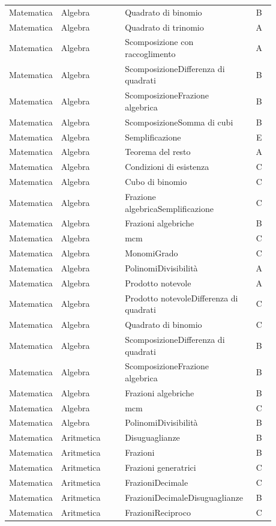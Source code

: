 \documentclass[20pt, a4paper]{article}
\begin{document}
\begin{longtable}{@{}>{\raggedright\arraybackslash}p{0.18\linewidth}>{\raggedright\arraybackslash}p{0.24\linewidth}>{\raggedright\arraybackslash}p{0.46\linewidth}c@{}}
Matematica & Algebra & Quadrato di binomio & B \\
Matematica & Algebra & Quadrato di trinomio & A \\
Matematica & Algebra & Scomposizione con raccoglimento & A \\
Matematica & Algebra & ScomposizioneDifferenza di quadrati & B \\
Matematica & Algebra & ScomposizioneFrazione algebrica & B \\
Matematica & Algebra & ScomposizioneSomma di cubi & B \\
Matematica & Algebra & Semplificazione & E \\
Matematica & Algebra & Teorema del resto & A \\
Matematica & Algebra & Condizioni di esistenza & C \\
Matematica & Algebra & Cubo di binomio & C \\
Matematica & Algebra & Frazione algebricaSemplificazione & C \\
Matematica & Algebra & Frazioni algebriche & B \\
Matematica & Algebra & mcm & C \\
Matematica & Algebra & MonomiGrado & C \\
Matematica & Algebra & PolinomiDivisibilità & A \\
Matematica & Algebra & Prodotto notevole & A \\
Matematica & Algebra & Prodotto notevoleDifferenza di quadrati & C \\
Matematica & Algebra & Quadrato di binomio & C \\
Matematica & Algebra & ScomposizioneDifferenza di quadrati & B \\
Matematica & Algebra & ScomposizioneFrazione algebrica & B \\
Matematica & Algebra & Frazioni algebriche & B \\
Matematica & Algebra & mcm & C \\
Matematica & Algebra & PolinomiDivisibilità & B \\
Matematica & Aritmetica & Disuguaglianze & B \\
Matematica & Aritmetica & Frazioni & B \\
Matematica & Aritmetica & Frazioni generatrici & C \\
Matematica & Aritmetica & FrazioniDecimale & C \\
Matematica & Aritmetica & FrazioniDecimaleDisuguaglianze & B \\
Matematica & Aritmetica & FrazioniReciproco & C \\

\end{longtable}
\end{document}
